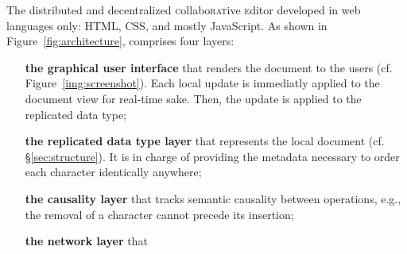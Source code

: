 The distributed and decentralized \textsc{c}ollabo\textsc{rat}ive
\textsc{e}ditor \CRATE developed in web languages only: HTML, CSS, and mostly
JavaScript. As shown in Figure~\ref{fig:architecture}, \CRATE comprises four
layers:
\begin{enumerate}[(i)]
\item [\textbf{the graphical user interface}] that renders the document to the users
  (cf. Figure~\ref{img:screenshot}). Each local update is immediatly applied to
  the document view for real-time sake. Then, the update is applied to the
  replicated data type;
\item [\textbf{the replicated data type layer}] that represents the local document
  (cf. §\ref{sec:structure}). It is in charge of providing the metadata
  necessary to order each character identically anywhere;
\item [\textbf{the causality layer}] that tracks semantic causality between operations,
  e.g., the removal of a character cannot precede its insertion;
\item [\textbf{the network layer}] that
\end{enumerate}



